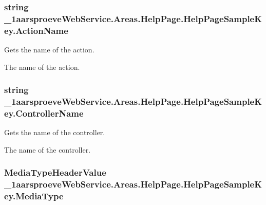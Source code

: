 \subsubsection[{Action\+Name}]{\setlength{\rightskip}{0pt plus 5cm}string \+\_\+1aarsproeve\+Web\+Service.\+Areas.\+Help\+Page.\+Help\+Page\+Sample\+Key.\+Action\+Name\hspace{0.3cm}{\ttfamily [get]}}\label{class__1aarsproeve_web_service_1_1_areas_1_1_help_page_1_1_help_page_sample_key_abb5930ab215393929bd5fc488c551f32}


Gets the name of the action. 

The name of the action. \hypertarget{class__1aarsproeve_web_service_1_1_areas_1_1_help_page_1_1_help_page_sample_key_a83d3909e7f8daf7ab92060c21afef237}{}
\subsubsection[{Controller\+Name}]{\setlength{\rightskip}{0pt plus 5cm}string \+\_\+1aarsproeve\+Web\+Service.\+Areas.\+Help\+Page.\+Help\+Page\+Sample\+Key.\+Controller\+Name\hspace{0.3cm}{\ttfamily [get]}}\label{class__1aarsproeve_web_service_1_1_areas_1_1_help_page_1_1_help_page_sample_key_a83d3909e7f8daf7ab92060c21afef237}


Gets the name of the controller. 

The name of the controller. \hypertarget{class__1aarsproeve_web_service_1_1_areas_1_1_help_page_1_1_help_page_sample_key_a3db7a3c071a64389856208253ce6a8c3}{}
\subsubsection[{Media\+Type}]{\setlength{\rightskip}{0pt plus 5cm}Media\+Type\+Header\+Value \+\_\+1aarsproeve\+Web\+Service.\+Areas.\+Help\+Page.\+Help\+Page\+Sample\+Key.\+Media\+Type\hspace{0.3cm}{\ttfamily [get]}}\label{class__1aarsproeve_web_service_1_1_areas_1_1_help_page_1_1_help_page_sample_key_a3db7a3c071a64389856208253ce6a8c3}


